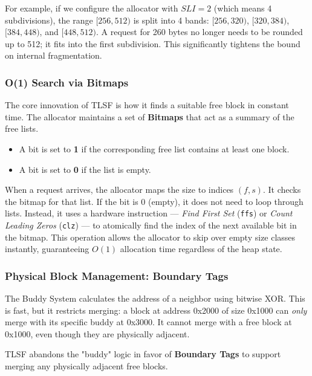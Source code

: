 \documentclass[a4paper,10pt,twoside]{report}
\theoremstyle{definition}
\begin{document}
For example, if we configure the allocator with $SLI = 2$ (which means 4 subdivisions), the range $[256, 512)$ is split into 4 bands: $[256, 320)$, $[320, 384)$, $[384, 448)$, and $[448, 512)$. A request for 260 bytes no longer needs to be rounded up to 512; it fits into the first subdivision. This significantly tightens the bound on internal fragmentation.

\subsubsection{O(1) Search via Bitmaps}
The core innovation of TLSF is how it finds a suitable free block in constant time. The allocator maintains a set of \textbf{Bitmaps} that act as a summary of the free lists.
\begin{itemize}
    \item A bit is set to \textbf{1} if the corresponding free list contains at least one block.
    \item A bit is set to \textbf{0} if the list is empty.
\end{itemize}

When a request arrives, the allocator maps the size to indices $(f, s)$. It checks the bitmap for that list. If the bit is 0 (empty), it does not need to loop through lists. Instead, it uses a hardware instruction --- \textit{Find First Set} (\texttt{ffs}) or \textit{Count Leading Zeros} (\texttt{clz}) --- to atomically find the index of the next available bit in the bitmap. This operation allows the allocator to skip over empty size classes instantly, guaranteeing $O(1)$ allocation time regardless of the heap state.

\subsubsection{Physical Block Management: Boundary Tags}
The Buddy System calculates the address of a neighbor using bitwise XOR. This is fast, but it restricts merging: a block at address 0x2000 of size 0x1000 can \textit{only} merge with its specific buddy at 0x3000. It cannot merge with a free block at 0x1000, even though they are physically adjacent.

TLSF abandons the "buddy" logic in favor of \textbf{Boundary Tags} to support merging any physically adjacent free blocks.
\end{document}
